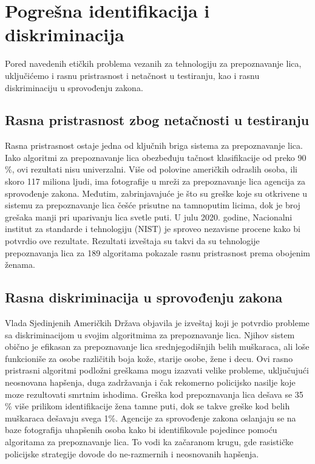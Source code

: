 \documentclass{article}
\begin{document}
\newpage

\section{Pogrešna identifikacija i diskriminacija}

Pored navedenih etičkih problema vezanih za tehnologiju za prepoznavanje lica, uključićemo i rasnu pristrasnost i netačnost u testiranju, kao i rasnu diskriminaciju u sprovođenju zakona. 

\subsection{Rasna pristrasnost zbog netačnosti u testiranju}

Rasna pristrasnost ostaje jedna od ključnih briga sistema za prepoznavanje lica. Iako algoritmi za prepoznavanje lica obezbeđuju tačnost klasifikacije od preko 90 \%,  ovi rezultati nisu univerzalni.
\newline
\newline
Više od polovine američkih odraslih osoba, ili skoro 117 miliona ljudi, ima fotografije u mreži za prepoznavanje lica agencija za sprovođenje zakona. Međutim, zabrinjavajuće je što su greške koje su otkrivene u sistemu za prepoznavanje lica češće prisutne na tamnoputim licima, dok je broj grešaka manji pri uparivanju lica svetle puti. \cite{sedma}
\newline
\newline
U julu 2020. godine, Nacionalni institut za standarde i tehnologiju (NIST) je sproveo nezavisne procene kako bi potvrdio ove rezultate. Rezultati izveštaja su takvi da su tehnologije prepoznavanja lica za 189 algoritama pokazale rasnu pristrasnost prema obojenim ženama. 
\newline
\newline
\subsection{Rasna diskriminacija u sprovođenju zakona}

Vlada Sjedinjenih Američkih Država objavila je izveštaj koji je potvrdio probleme sa diskriminacijom u svojim algoritmima za prepoznavanje lica. Njihov sistem obično je efikasan za prepoznavanje lica srednjegodišnjih belih muškaraca, ali loše funkcioniše za osobe različitih boja kože, starije osobe, žene i decu. Ovi rasno pristrasni algoritmi podložni greškama mogu izazvati velike probleme, uključujući neosnovana hapšenja, duga zadržavanja i čak rekomerno policijsko nasilje koje moze rezultovati smrtnim ishodima. \cite{sesta}
\newline
\newline
Greška kod prepoznavanja lica dešava se 35 \% više prilikom identifikacije žena tamne puti, dok se takve greške kod belih muškaraca dešavaju svega 1\%.
\newline
\newline
Agencije za sprovođenje zakona oslanjaju se na baze fotografija uhapšenih osoba kako bi identifikovale pojedince pomoću algoritama za prepoznavanje lica. To vodi ka začaranom krugu, gde rasističke policijske strategije dovode do ne-razmernih i neosnovanih hapšenja.
\end{document}
